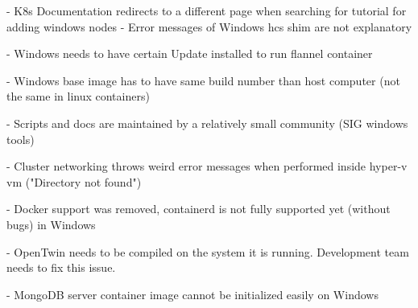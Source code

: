 - K8s Documentation redirects to a different page when searching for tutorial for adding windows nodes
- Error messages of Windows hcs shim are not explanatory

- Windows needs to have certain Update installed to run flannel container

- Windows base image has to have same build number than host computer (not the same in linux containers)

- Scripts and docs are maintained by a relatively small community (SIG windows tools)

- Cluster networking throws weird error messages when performed inside hyper-v vm ("Directory not found")

- Docker support was removed, containerd is not fully supported yet (without bugs) in Windows

- OpenTwin needs to be compiled on the system it is running. Development team needs to fix this issue.

- MongoDB server container image cannot be initialized easily on Windows
